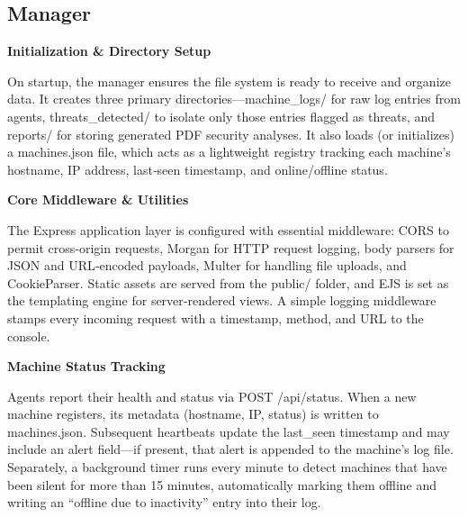 




\subsection{Manager}

\textbf{Initialization \& Directory Setup}

On startup, the manager ensures the file system is ready to receive and organize data. It creates three primary directories—machine_logs/ for raw log entries from agents, threats_detected/ to isolate only those entries flagged as threats, and reports/ for storing generated PDF security analyses. It also loads (or initializes) a machines.json file, which acts as a lightweight registry tracking each machine’s hostname, IP address, last‐seen timestamp, and online/offline status.

\textbf{Core Middleware \& Utilities}

The Express application layer is configured with essential middleware: CORS to permit cross‐origin requests, Morgan for HTTP request logging, body parsers for JSON and URL‐encoded payloads, Multer for handling file uploads, and CookieParser. Static assets are served from the public/ folder, and EJS is set as the templating engine for server‐rendered views. A simple logging middleware stamps every incoming request with a timestamp, method, and URL to the console.

\textbf{Machine Status Tracking}

Agents report their health and status via POST /api/status. When a new machine registers, its metadata (hostname, IP, status) is written to machines.json. Subsequent heartbeats update the last_seen timestamp and may include an alert field—if present, that alert is appended to the machine’s log file. Separately, a background timer runs every minute to detect machines that have been silent for more than 15 minutes, automatically marking them offline and writing an “offline due to inactivity” entry into their log.

